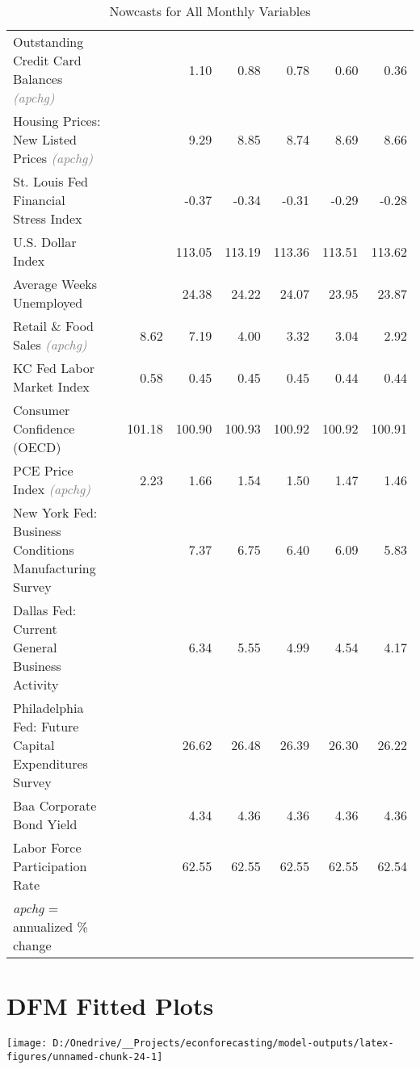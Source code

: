 \documentclass[11pt, letterpaper]{article}\usepackage[]{graphicx}\usepackage[]{color}
\begin{document}
\begin{table}[H]
\begin{tabular}{lrrrrrrr}
  Outstanding Credit Card Balances \textit{\footnotesize\textcolor{gray}{(apchg)}} &  &  & 1.10 & 0.88 & 0.78 & 0.60 & 0.36 \\ 
  Housing Prices: New Listed Prices \textit{\footnotesize\textcolor{gray}{(apchg)}} &  &  & 9.29 & 8.85 & 8.74 & 8.69 & 8.66 \\ 
  St. Louis Fed Financial Stress Index &  &  & -0.37 & -0.34 & -0.31 & -0.29 & -0.28 \\ 
  U.S. Dollar Index &  &  & 113.05 & 113.19 & 113.36 & 113.51 & 113.62 \\ 
  Average Weeks Unemployed &  &  & 24.38 & 24.22 & 24.07 & 23.95 & 23.87 \\ 
  Retail \& Food Sales \textit{\footnotesize\textcolor{gray}{(apchg)}} &  & 8.62 & 7.19 & 4.00 & 3.32 & 3.04 & 2.92 \\ 
  KC Fed Labor Market Index &  & 0.58 & 0.45 & 0.45 & 0.45 & 0.44 & 0.44 \\ 
  Consumer Confidence (OECD) &  & 101.18 & 100.90 & 100.93 & 100.92 & 100.92 & 100.91 \\ 
  PCE Price Index \textit{\footnotesize\textcolor{gray}{(apchg)}} &  & 2.23 & 1.66 & 1.54 & 1.50 & 1.47 & 1.46 \\ 
  New York Fed: Business Conditions Manufacturing Survey &  &  & 7.37 & 6.75 & 6.40 & 6.09 & 5.83 \\ 
  Dallas Fed: Current General Business Activity &  &  & 6.34 & 5.55 & 4.99 & 4.54 & 4.17 \\ 
  Philadelphia Fed: Future Capital Expenditures Survey &  &  & 26.62 & 26.48 & 26.39 & 26.30 & 26.22 \\ 
  Baa Corporate Bond Yield &  &  & 4.34 & 4.36 & 4.36 & 4.36 & 4.36 \\ 
  Labor Force Participation Rate &  &  & 62.55 & 62.55 & 62.55 & 62.55 & 62.54 \\ 
   \hline 
 \textit{apchg} = annualized \% change 
\end{tabular}
\endgroup
\caption{Nowcasts for All Monthly Variables} 
\end{table}



\appendix
\appendixpage
\addappheadtotoc

\section{DFM Fitted Plots}


{\centering \texttt{[image: D:/Onedrive/\_\_Projects/econforecasting/model-outputs/latex-figures/unnamed-chunk-24-1]} 

}
\end{document}
